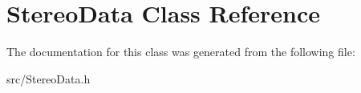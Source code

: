 \hypertarget{class_stereo_data}{}\section{Stereo\+Data Class Reference}
\label{class_stereo_data}


The documentation for this class was generated from the following file\+:\begin{DoxyCompactItemize}
\item 
src/Stereo\+Data.\+h\end{DoxyCompactItemize}
